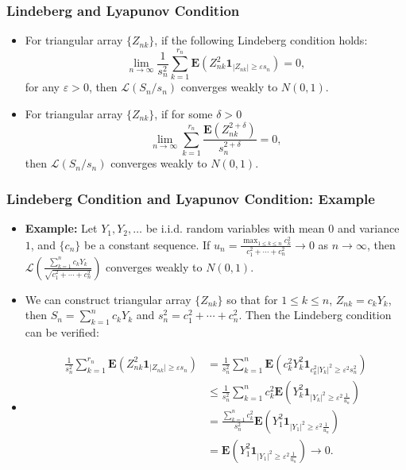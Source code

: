 \documentclass[handout]{beamer}
\newcommand{\BE}{\mathbf{E}}
\newcommand{\BI}{\mathbf{1}}
\begin{document}
 
     \frame
{
  \frametitle{ Lindeberg and Lyapunov Condition}
   \begin{itemize}

\item<1-> []\begin{Theorem} For triangular array $\{Z_{nk}\}$, if the following Lindeberg condition holds:
$$\lim_{n\rightarrow \infty} \frac{1}{s_n^2} \sum_{k=1}^{r_n} \BE(Z_{nk}^2 \BI_{|Z_{nk}|\geq \varepsilon s_n})=0,$$
for any $\varepsilon>0$, then $\mathcal{L} (S_n/s_n)$ converges weakly to $N(0,1)$.
\end{Theorem}

\item<2-> []\begin{Theorem} For triangular array $\{Z_{nk}\}$, if for some $\delta>0$
$$\lim_{n\rightarrow \infty} \sum_{k=1}^{r_n} \frac{ \BE(Z_{nk}^{2+\delta})}{s_n^{2+\delta}}=0,$$
then $\mathcal{L} (S_n/s_n)$ converges weakly to $N(0,1)$.
\end{Theorem}
\end{itemize}
 }



 
     \frame
{
  \frametitle{Lindeberg Condition and Lyapunov Condition: Example}
   \begin{itemize}

\item<1->\textbf{Example:} Let $Y_1, Y_2,\ldots$ be i.i.d. random variables with mean $0$ and variance $1$, and $\{c_n\}$ be a constant sequence. If $u_n=\frac{\max_{1\leq k\leq n} c_k^2}{c_1^2+\cdots+c_n^2}\rightarrow 0$ as $n \rightarrow \infty$, then $\mathcal{L}(\frac{\sum_{k=1}^n c_kY_k}{\sqrt{c_1^2+\cdots+c_n^2}})$ converges weakly to $N(0,1)$. 

\item<2-> We can construct triangular array $\{Z_{nk}\}$ so that for $1\leq k \leq n$, $Z_{nk}=c_kY_k$, then $S_n=\sum_{k=1}^n c_kY_k$ and $s_n^2=c_1^2+\cdots+c_n^2$. Then the Lindeberg condition can be verified:
\item<3->[] \begin{align*}
\frac{1}{s_n^2} \sum_{k=1}^{r_n} \BE(Z_{nk}^2 \BI_{|Z_{nk}|\geq \varepsilon s_n})& =\frac{1}{s_n^2} \sum_{k=1}^{n} \BE(c_{k}^2Y_{k}^2 \BI_{c_k^2|Y_{k}|^2 \geq \varepsilon^2 s^2_n}) \\
&\leq \frac{1}{s_n^2} \sum_{k=1}^{n} c_{k}^2 \BE(Y_{k}^2 \BI_{|Y_{k}|^2 \geq \varepsilon^2 \frac{1}{u_n}}) 
\\ & =\frac{\sum_{k=1}^{n} c_{k}^2}{s_n^2} \BE(Y_{1}^2 \BI_{|Y_{1}|^2 \geq \varepsilon^2 \frac{1}{u_n}}) \\
& =\BE(Y_{1}^2 \BI_{|Y_{1}|^2 \geq \varepsilon^2 \frac{1}{u_n}}) \rightarrow 0.
\end{align*}

\end{itemize}
}
\end{document}

